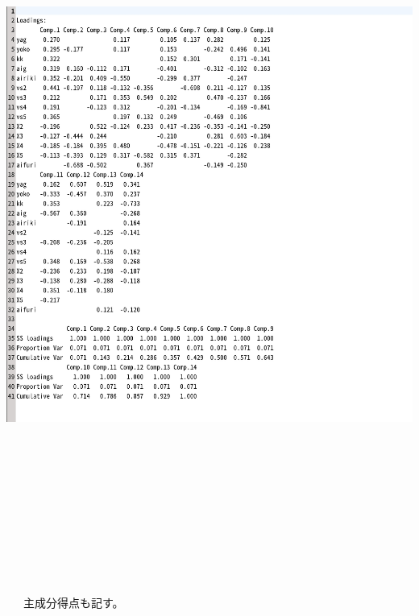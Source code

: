 \documentclass[11pt,a4paper,dvipdfmx]{jsarticle}
\begin{document}
\begin{minipage}[t]{0.47\hsize}
    \centering
    \includegraphics[width=2.5\textwidth]{graph/loadings-shougi-pc.jpg}
\end{minipage}
\\\\\\\\\\\\\\\\\\\\\
　主成分得点も記す。
\\
\end{document}

